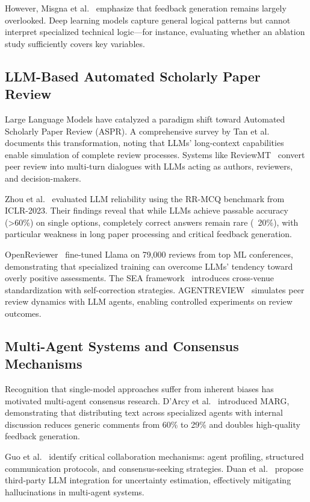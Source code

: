However, Misgna et al.~\cite{misgna2024survey} emphasize that feedback generation remains largely overlooked. Deep learning models capture general logical patterns but cannot interpret specialized technical logic---for instance, evaluating whether an ablation study sufficiently covers key variables.

\subsection{LLM-Based Automated Scholarly Paper Review}

Large Language Models have catalyzed a paradigm shift toward Automated Scholarly Paper Review (ASPR). A comprehensive survey by Tan et al.~\cite{tan2025llm} documents this transformation, noting that LLMs' long-context capabilities enable simulation of complete review processes. Systems like ReviewMT~\cite{tan2024reviewmt} convert peer review into multi-turn dialogues with LLMs acting as authors, reviewers, and decision-makers.

Zhou et al.~\cite{zhou2024llm} evaluated LLM reliability using the RR-MCQ benchmark from ICLR-2023. Their findings reveal that while LLMs achieve passable accuracy (>60\%) on single options, completely correct answers remain rare (~20\%), with particular weakness in long paper processing and critical feedback generation.

OpenReviewer~\cite{openreviewer2024} fine-tuned Llama on 79,000 reviews from top ML conferences, demonstrating that specialized training can overcome LLMs' tendency toward overly positive assessments. The SEA framework~\cite{sea2024} introduces cross-venue standardization with self-correction strategies. AGENTREVIEW~\cite{jin2024agentreview} simulates peer review dynamics with LLM agents, enabling controlled experiments on review outcomes.

\subsection{Multi-Agent Systems and Consensus Mechanisms}

Recognition that single-model approaches suffer from inherent biases has motivated multi-agent consensus research. D'Arcy et al.~\cite{darcy2024marg} introduced MARG, demonstrating that distributing text across specialized agents with internal discussion reduces generic comments from 60\% to 29\% and doubles high-quality feedback generation.

Guo et al.~\cite{guo2024survey} identify critical collaboration mechanisms: agent profiling, structured communication protocols, and consensus-seeking strategies. Duan et al.~\cite{duan2024consensus} propose third-party LLM integration for uncertainty estimation, effectively mitigating hallucinations in multi-agent systems.

